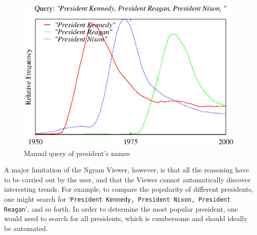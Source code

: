\documentclass[11pt,a4paper]{article}
\newcommand{\query}[1]{\texttt{#1}}
\begin{document}
\begin{figure}
\includegraphics[width=\columnwidth]{graphs/kenreanixon}
\caption{\label{fig:manual president} Manual query of president's names}
\end{figure}

A major limitation of the Ngram Viewer, however, is that all the reasoning have to be carried out by the user, and that the Viewer cannot automatically discover interesting trends. For example, to compare the popularity of different presidents, one might search for `\query{President Kennedy, President Nixon, President Reagan}', and so forth. In order to determine the most popular president, one would need to search for all presidents, which is cumbersome and should ideally be automated.
\end{document}
